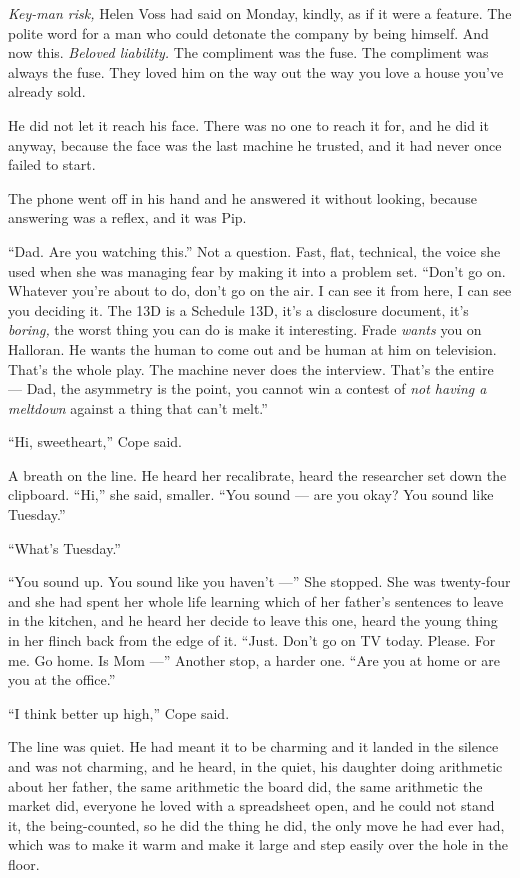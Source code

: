 \documentclass[11pt,openany]{book}
\newcommand{\scenebreak}{\par\vspace{0.5\baselineskip}\begin{center}\textasteriskcentered\quad\textasteriskcentered\quad\textasteriskcentered\end{center}\vspace{0.5\baselineskip}\par}
\begin{document}
\textit{Key-man risk,} Helen Voss had said on Monday, kindly, as if it were a feature. The polite word for a man who could detonate the company by being himself. And now this. \textit{Beloved liability.} The compliment was the fuse. The compliment was always the fuse. They loved him on the way out the way you love a house you've already sold.

He did not let it reach his face. There was no one to reach it for, and he did it anyway, because the face was the last machine he trusted, and it had never once failed to start.


\scenebreak


The phone went off in his hand and he answered it without looking, because answering was a reflex, and it was Pip.

``Dad. Are you watching this.'' Not a question. Fast, flat, technical, the voice she used when she was managing fear by making it into a problem set. ``Don't go on. Whatever you're about to do, don't go on the air. I can see it from here, I can see you deciding it. The 13D is a Schedule 13D, it's a disclosure document, it's \textit{boring,} the worst thing you can do is make it interesting. Frade \textit{wants} you on Halloran. He wants the human to come out and be human at him on television. That's the whole play. The machine never does the interview. That's the entire --- Dad, the asymmetry is the point, you cannot win a contest of \textit{not having a meltdown} against a thing that can't melt.''

``Hi, sweetheart,'' Cope said.

A breath on the line. He heard her recalibrate, heard the researcher set down the clipboard. ``Hi,'' she said, smaller. ``You sound --- are you okay? You sound like Tuesday.''

``What's Tuesday.''

``You sound up. You sound like you haven't ---'' She stopped. She was twenty-four and she had spent her whole life learning which of her father's sentences to leave in the kitchen, and he heard her decide to leave this one, heard the young thing in her flinch back from the edge of it. ``Just. Don't go on TV today. Please. For me. Go home. Is Mom ---'' Another stop, a harder one. ``Are you at home or are you at the office.''

``I think better up high,'' Cope said.

The line was quiet. He had meant it to be charming and it landed in the silence and was not charming, and he heard, in the quiet, his daughter doing arithmetic about her father, the same arithmetic the board did, the same arithmetic the market did, everyone he loved with a spreadsheet open, and he could not stand it, the being-counted, so he did the thing he did, the only move he had ever had, which was to make it warm and make it large and step easily over the hole in the floor.
\end{document}
